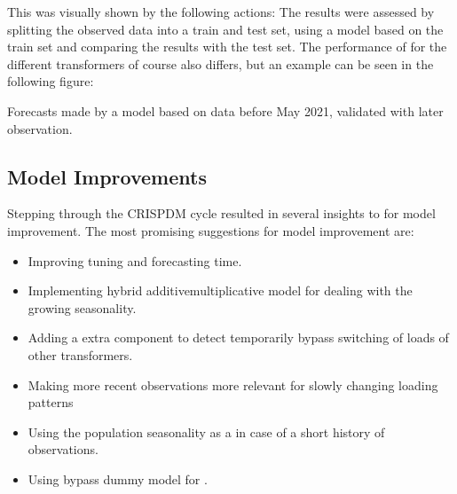 \documentclass[letterpaper,10pt,english]{sphinxmanual}
\let\sphinxpxdimen\pdfpxdimen\else\newdimen\sphinxpxdimen
\begin{document}
This was visually shown by the following actions:
The results were assessed by splitting the observed data into a train and test set, using a model based on the train set and comparing the results with the test set.
The performance of for the different transformers of course also differs, but an example can be seen in the following figure:
\begin{quote}

\noindent{\hspace*{\fill}\sphinxincludegraphics[width=800\sphinxpxdimen]{{validation}.png}\hspace*{\fill}}
\end{quote}

Forecasts made by a model based on data before May 2021, validated with later observation.


\subsection{Model Improvements}
\label{\detokenize{evaluation:model-improvements}}
Stepping through the CRISP\sphinxhyphen{}DM cycle resulted in several insights to for model improvement.
The most promising suggestions for model improvement are:
\begin{itemize}
\item {} 
Improving tuning and forecasting time.

\item {} 
Implementing hybrid additive\sphinxhyphen{}multiplicative model for dealing with the growing seasonality.

\item {} 
Adding a extra component to detect temporarily bypass switching of loads of other transformers.

\item {} 
Making more recent observations more relevant for slowly changing loading patterns

\item {} 
Using the population seasonality as a  in case of a short history of observations.

\item {} 
Using by\sphinxhyphen{}pass dummy model for .

\end{itemize}
\end{document}
